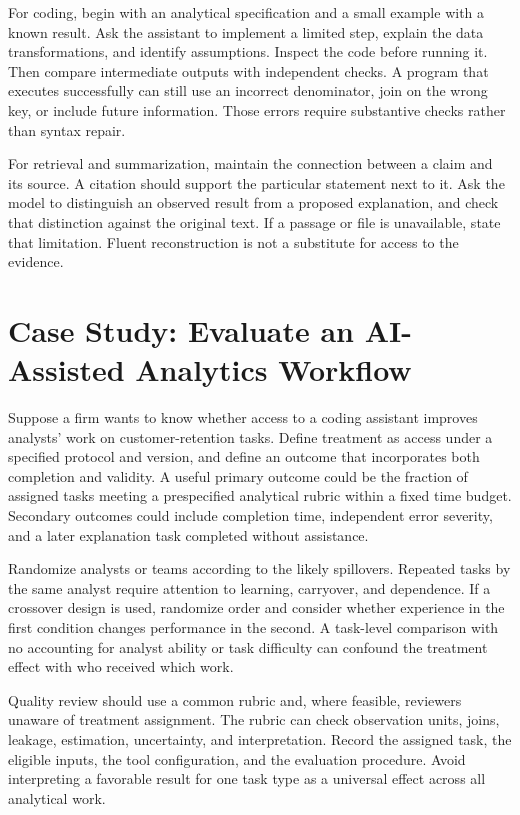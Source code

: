 For coding, begin with an analytical specification and a small example
with a known result. Ask the assistant to implement a limited step,
explain the data transformations, and identify assumptions. Inspect the
code before running it. Then compare intermediate outputs with
independent checks. A program that executes successfully can still use
an incorrect denominator, join on the wrong key, or include future
information. Those errors require substantive checks rather than syntax
repair.

For retrieval and summarization, maintain the connection between a claim
and its source. A citation should support the particular statement next
to it. Ask the model to distinguish an observed result from a proposed
explanation, and check that distinction against the original text. If a
passage or file is unavailable, state that limitation. Fluent
reconstruction is not a substitute for access to the evidence.

\hypertarget{M08-case-study-evaluate-an-ai-assisted-analytics-workflow}{%
\section{Case Study: Evaluate an AI-Assisted Analytics
Workflow}\label{M08-case-study-evaluate-an-ai-assisted-analytics-workflow}}

\noindent Suppose a firm wants to know whether access to a coding assistant
improves analysts' work on customer-retention tasks. Define treatment as
access under a specified protocol and version, and define an outcome
that incorporates both completion and validity. A useful primary outcome
could be the fraction of assigned tasks meeting a prespecified
analytical rubric within a fixed time budget. Secondary outcomes could
include completion time, independent error severity, and a later
explanation task completed without assistance.

Randomize analysts or teams according to the likely spillovers. Repeated
tasks by the same analyst require attention to learning, carryover, and
dependence. If a crossover design is used, randomize order and consider
whether experience in the first condition changes performance in the
second. A task-level comparison with no accounting for analyst ability
or task difficulty can confound the treatment effect with who received
which work.

Quality review should use a common rubric and, where feasible, reviewers
unaware of treatment assignment. The rubric can check observation units,
joins, leakage, estimation, uncertainty, and interpretation. Record the
assigned task, the eligible inputs, the tool configuration, and the
evaluation procedure. Avoid interpreting a favorable result for one task
type as a universal effect across all analytical work.

